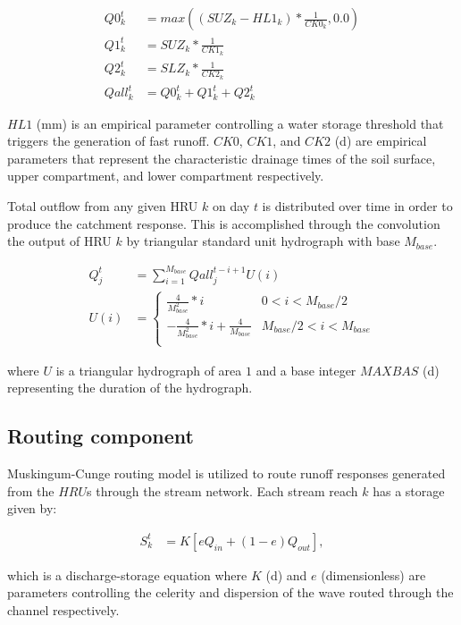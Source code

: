 \begin{align}
Q0_k^t &= max((SUZ_k - HL1_k) * \frac{1}{CK0_k}, 0.0)\\
Q1_k^t &= SUZ_k * \frac{1}{CK1_k}\\
Q2_k^t &= SLZ_k * \frac{1}{CK2_k}\\
Qall_k^t &= Q0_k^t + Q1_k^t + Q2_k^t
\end{align}

\noindent $HL1$ (\si{\milli\meter}) is an empirical parameter controlling a water storage threshold that triggers the generation of fast runoff. $CK0$, $CK1$, and $CK2$ (\si{\day}) are empirical parameters that represent the characteristic drainage times of the soil surface, upper compartment, and lower compartment respectively.

Total outflow from any given HRU $k$ on day $t$ is distributed over time in order to produce the catchment response. This is accomplished through the convolution the output of HRU $k$ by triangular standard unit hydrograph with base $M_{base}$.

\begin{align}
Q_j^t &= \sum_{i=1}^{M_{base}} Qall_j^{t-i+1} U(i) \\
U(i) &= \left\{
\begin{array}{ll}
\frac{4}{M_{base}^2}*i & 0 < i < M_{base}/2 \\
-\frac{4}{M_{base}^2}*i + \frac{4}{M_{base}} &  M_{base}/2 < i < M_{base} \\
\end{array}
\right.
\end{align}

\noindent where $U$ is a triangular hydrograph of area $1$ and a base integer $MAXBAS$ (\si{\day}) representing the duration of the hydrograph.

\subsection{Routing component}

Muskingum-Cunge routing model is utilized to route runoff responses generated from the $HRU$s through the stream network. Each stream reach $k$ has a storage given by:

\begin{align}
S_k^t &= K\left[eQ_{in} + (1 - e)Q_{out} \right],
\end{align}

which is a discharge-storage equation where $K$ (\si{\day}) and $e$ (dimensionless) are parameters controlling the celerity and dispersion of the wave routed through the channel respectively. 

